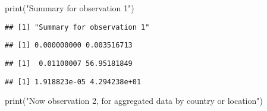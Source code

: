 \documentclass[
  12pt,
]{article}
\newenvironment{Shaded}{\begin{snugshade}}{\end{snugshade}}
\newcommand{\FunctionTok}[1]{\textcolor[rgb]{0.00,0.00,0.00}{#1}}
\newcommand{\NormalTok}[1]{#1}
\newcommand{\SpecialCharTok}[1]{\textcolor[rgb]{0.00,0.00,0.00}{#1}}
\newcommand{\StringTok}[1]{\textcolor[rgb]{0.31,0.60,0.02}{#1}}
\begin{document}
\begin{Shaded}
\begin{Highlighting}[]
\FunctionTok{print}\NormalTok{(}\StringTok{"Summary for observation 1"}\NormalTok{)}
\end{Highlighting}
\end{Shaded}

\begin{verbatim}
## [1] "Summary for observation 1"
\end{verbatim}

\begin{Shaded}
\end{Shaded}

\begin{verbatim}
## [1] 0.000000000 0.003516713
\end{verbatim}

\begin{Shaded}
\end{Shaded}

\begin{verbatim}
## [1]  0.01100007 56.95181849
\end{verbatim}

\begin{Shaded}
\end{Shaded}

\begin{verbatim}
## [1] 1.918823e-05 4.294238e+01
\end{verbatim}

\begin{Shaded}
\begin{Highlighting}[]
\FunctionTok{print}\NormalTok{(}\StringTok{"Now observation 2, for aggregated data by country or location"}\NormalTok{)}
\end{Highlighting}
\end{Shaded}
\end{document}
